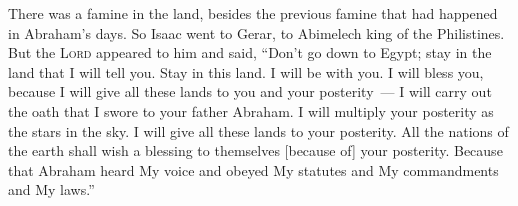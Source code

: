 
\begin{inparaenum}
     There was a famine in the land, besides the previous famine that had happened in Abraham's days. So Isaac went to Gerar, to Abimelech king of the Philistines.%
     But the \textsc{Lord} appeared to him and said, ``Don't go down to Egypt; stay in the land that I will tell you.%
     Stay in this land. I will be with you. I will bless you, because I will give all these lands to you and your posterity~--- I will carry out the oath that I swore to your father Abraham.%
     I will multiply your posterity as the stars in the sky. I will give all these lands to your posterity. All the nations of the earth shall wish a blessing to themselves [because of] your posterity.%
     Because that Abraham heard My voice and obeyed My statutes and My commandments and My laws.''%
    
\end{inparaenum}
